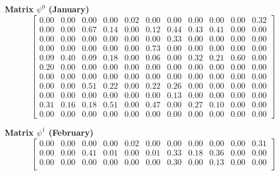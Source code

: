\documentclass[a4paper,fleqn]{cas-dc}
\begin{document}
\begin{scriptsize}
    
\textbf{Matrix $\psi^{0}$ (January)}
\[
\begin{bmatrix}

0.00 & 0.00 & 0.00 & 0.00 & 0.02 & 0.00 & 0.00 & 0.00 & 0.00 & 0.00 & 0.32\\

0.00 & 0.00 & 0.67 & 0.14 & 0.00 & 0.12 & 0.44 & 0.43 & 0.41 & 0.00 & 0.00\\

0.00 & 0.00 & 0.00 & 0.00 & 0.00 & 0.00 & 0.33 & 0.00 & 0.00 & 0.00 & 0.00\\

0.00 & 0.00 & 0.00 & 0.00 & 0.00 & 0.73 & 0.00 & 0.00 & 0.00 & 0.00 & 0.00\\

0.09 & 0.40 & 0.09 & 0.18 & 0.00 & 0.06 & 0.00 & 0.32 & 0.21 & 0.60 & 0.00\\

0.20 & 0.00 & 0.00 & 0.00 & 0.00 & 0.00 & 0.00 & 0.00 & 0.00 & 0.00 & 0.00\\

0.00 & 0.00 & 0.00 & 0.00 & 0.00 & 0.00 & 0.00 & 0.00 & 0.00 & 0.00 & 0.00\\

0.00 & 0.00 & 0.51 & 0.22 & 0.00 & 0.22 & 0.26 & 0.00 & 0.00 & 0.00 & 0.00\\

0.00 & 0.00 & 0.00 & 0.00 & 0.00 & 0.00 & 0.13 & 0.00 & 0.00 & 0.00 & 0.00\\

0.31 & 0.16 & 0.18 & 0.51 & 0.00 & 0.47 & 0.00 & 0.27 & 0.10 & 0.00 & 0.00\\

0.00 & 0.00 & 0.00 & 0.00 & 0.00 & 0.00 & 0.00 & 0.00 & 0.00 & 0.00 & 0.00

\end{bmatrix}
\]

\textbf{Matrix $\psi^{1}$ (February)}
\[
\begin{bmatrix}

0.00 & 0.00 & 0.00 & 0.00 & 0.02 & 0.00 & 0.00 & 0.00 & 0.00 & 0.00 & 0.31\\

0.00 & 0.00 & 0.41 & 0.01 & 0.00 & 0.01 & 0.33 & 0.18 & 0.36 & 0.00 & 0.00\\

0.00 & 0.00 & 0.00 & 0.00 & 0.00 & 0.00 & 0.30 & 0.00 & 0.13 & 0.00 & 0.00\\


\end{bmatrix}\]
\end{scriptsize}
\end{document}
